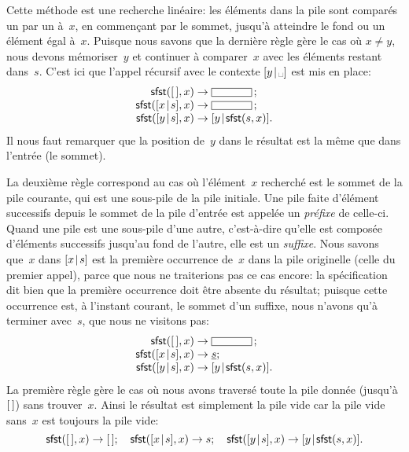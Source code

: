 Cette méthode est une recherche linéaire:
les éléments dans la pile sont comparés un par un à~\(x\), en
commençant par le sommet, jusqu'à atteindre le fond ou un élément égal
à~\(x\). Puisque nous savons que la dernière règle gère le cas où \(x
\neq y\), nous devons mémoriser~\(y\) et continuer à comparer~\(x\)
avec les éléments restant dans~\(s\). C'est ici que l'appel récursif
avec le contexte \(\cons{y}{\text{\textvisiblespace}}\) est mis en
place:
\begin{equation*}
\begin{array}{r@{\;}l@{\;}l}
\fun{sfst}(\el,x) & \rightarrow & \fbcode{CCCCC}\,;\\
\fun{sfst}(\cons{x}{s},x) & \rightarrow & \fbcode{CCCCC}\,;\\
\fun{sfst}(\cons{y}{s},x) & \rightarrow & \cons{y}{\fun{sfst}(s,x)}.
\end{array}
\end{equation*}
Il nous faut remarquer que la position de~\(y\) dans le résultat est
la même que dans l'entrée (le sommet).

La deuxième règle correspond au cas où l'élément~\(x\) recherché est
le sommet de la pile courante, qui est une sous-pile de la pile
initiale. Une pile faite d'élément successifs depuis le sommet de la
pile d'entrée est appelée un \emph{préfixe} de celle-ci. Quand une
pile est une sous-pile d'une autre, c'est-à-dire qu'elle est composée
d'éléments successifs jusqu'au fond de l'autre, elle est un
\emph{suffixe}. Nous savons que~\(x\) dans \([{x}\!\mid\!{s}]\) est la
première occurrence de~\(x\) dans la pile originelle (celle du premier
appel), parce que nous ne traiterions pas ce cas encore: la
spécification dit bien que la première occurrence doit être absente du
résultat; puisque cette occurrence est, à l'instant courant, le sommet
d'un suffixe, nous n'avons qu'à terminer avec~\(s\), que nous ne
visitons pas:
\begin{equation*}
\begin{array}{r@{\;}l@{\;}l}
\fun{sfst}(\el,x)         & \rightarrow & \fbcode{CCCCC}\,;\\
\fun{sfst}(\cons{x}{s},x) & \rightarrow & \underline{s};\\
\fun{sfst}(\cons{y}{s},x) & \rightarrow & \cons{y}{\fun{sfst}(s,x)}.
\end{array}
\end{equation*}
La première règle gère le cas où nous avons traversé toute la pile
donnée (jusqu'à \([\,]\)) sans trouver~\(x\). Ainsi le résultat est
simplement la pile vide car la pile vide sans~\(x\) est toujours la
pile vide:
\begin{equation*}
\textsf{sfst}([\,],x)         \rightarrow [\,];\quad
\textsf{sfst}([{x}\!\mid\!{s}],x) \rightarrow s;\quad
\textsf{sfst}([{y}\!\mid\!{s}],x) \rightarrow [{y}\!\mid\!{\textsf{sfst}(s,x)}].
\end{equation*}


